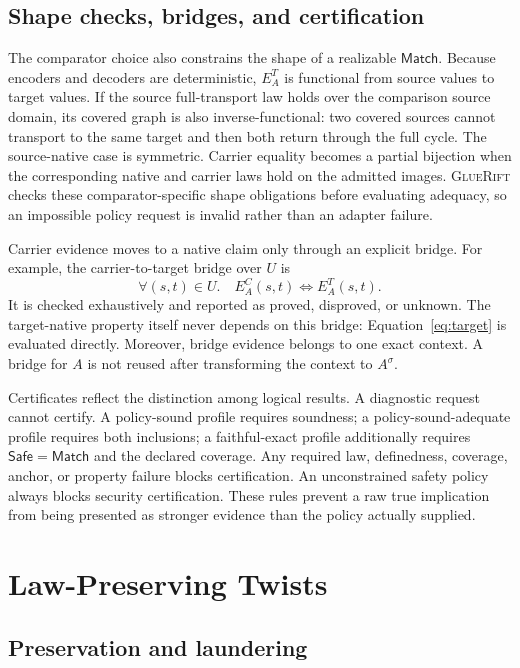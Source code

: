 \documentclass[sigconf,anonymous,review]{acmart}
\newcommand{\sys}{\textsc{GlueRift}\xspace}
\newcommand{\safe}{\mathsf{Safe}}
\newcommand{\matchrel}{\mathsf{Match}}
\begin{document}
\subsection{Shape checks, bridges, and certification}

The comparator choice also constrains the shape of a realizable
$\matchrel$.  Because encoders and decoders are deterministic,
$E_A^T$ is functional from source values to target values.  If the
source full-transport law holds over the comparison source domain, its
covered graph is also inverse-functional: two covered sources cannot
transport to the same target and then both return through the full
cycle.  The source-native case is symmetric.  Carrier equality becomes
a partial bijection when the corresponding native and carrier laws
hold on the admitted images.  \sys checks these comparator-specific
shape obligations before evaluating adequacy, so an impossible policy
request is invalid rather than an adapter failure.

Carrier evidence moves to a native claim only through an explicit
bridge.  For example, the carrier-to-target bridge over $U$ is
\[
\forall(s,t)\in U.\quad E_A^C(s,t)\Longleftrightarrow E_A^T(s,t).
\]
It is checked exhaustively and reported as proved, disproved, or
unknown.  The target-native property itself never depends on this
bridge: Equation~\eqref{eq:target} is evaluated directly.  Moreover,
bridge evidence belongs to one exact context.  A bridge for $A$ is not
reused after transforming the context to $A^\sigma$.

Certificates reflect the distinction among logical results.  A
diagnostic request cannot certify.  A policy-sound profile requires
soundness; a policy-sound-adequate profile requires both inclusions; a
faithful-exact profile additionally requires $\safe=\matchrel$ and the
declared coverage.  Any required law, definedness, coverage, anchor, or
property failure blocks certification.  An unconstrained safety policy
always blocks security certification.  These rules prevent a raw true
implication from being presented as stronger evidence than the policy
actually supplied.

\section{Law-Preserving Twists}
\label{sec:twists}

\subsection{Preservation and laundering}
\end{document}
